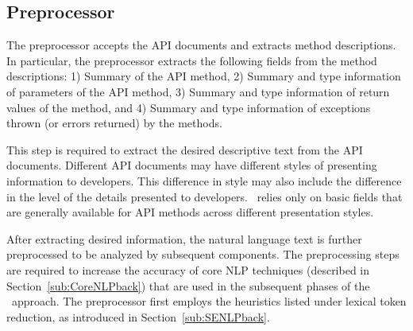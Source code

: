 \subsection{Preprocessor}
\label{sub:prep}

The preprocessor accepts the API documents and extracts method descriptions.
In particular, the preprocessor extracts the following fields from the method descriptions: 
1) Summary of the API method,
2) Summary and type information of parameters of the API method, 
3) Summary and type information of return values of the method, and
4) Summary and type information of exceptions thrown (or errors returned) by the methods.

This step is required to extract the desired descriptive text from the API documents.
Different API documents may have different styles of presenting information to developers.
This difference in style may also include the difference in the level of the details presented to developers.
\tool\ relies only on basic fields that are generally available for API methods across different presentation styles. 

After extracting desired information, the natural language text is further preprocessed to be analyzed by subsequent components.
The preprocessing steps are required to increase the accuracy of core NLP techniques (described in Section~\ref{sub:CoreNLPback}) that are used in the subsequent phases of the \tool\ approach.
The preprocessor first employs the heuristics listed under lexical token reduction, as introduced in Section~\ref{sub:SENLPback}.

